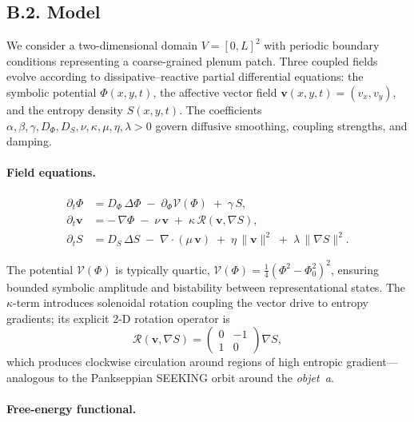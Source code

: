 \documentclass[12pt,a4paper]{article}
\begin{document}
\subsection*{B.2. Model}

We consider a two-dimensional domain \(V=[0,L]^2\) with periodic boundary conditions representing a coarse-grained plenum patch.
Three coupled fields evolve according to dissipative–reactive partial differential equations: the symbolic potential \(\Phi(x,y,t)\), the affective vector field \(\mathbf{v}(x,y,t)=(v_x,v_y)\), and the entropy density \(S(x,y,t)\).
The coefficients
\(\alpha,\beta,\gamma,D_\Phi,D_S,\nu,\kappa,\mu,\eta,\lambda>0\)
govern diffusive smoothing, coupling strengths, and damping.

\paragraph{Field equations.}

\begin{align}
\partial_t \Phi &= D_\Phi\,\Delta \Phi \;-\; \partial_\Phi \mathcal{V}(\Phi) \;+\; \gamma\,S, \label{eq:B-Phi}\\[0.3em]
\partial_t \mathbf{v} &= -\,\nabla \Phi \;-\; \nu\,\mathbf{v} \;+\; \kappa\,\mathcal{R}(\mathbf{v},\nabla S), \label{eq:B-v}\\[0.3em]
\partial_t S &= D_S\,\Delta S \;-\; \nabla\!\cdot(\mu\,\mathbf{v}) \;+\; \eta\,\|\mathbf{v}\|^2 \;+\; \lambda\,\|\nabla S\|^2. \label{eq:B-S}
\end{align}

The potential \(\mathcal{V}(\Phi)\) is typically quartic,
\(\mathcal{V}(\Phi)=\frac{1}{4}(\Phi^2-\Phi_0^2)^2\),
ensuring bounded symbolic amplitude and bistability between representational states.
The \(\kappa\)-term introduces solenoidal rotation coupling the vector drive to entropy gradients; its explicit 2-D rotation operator is
\[
\mathcal{R}(\mathbf{v},\nabla S)
 = \begin{pmatrix} 0 & -1 \\[2pt] 1 & 0 \end{pmatrix}\!\nabla S,
\]
which produces clockwise circulation around regions of high entropic gradient—analogous to the Pankseppian SEEKING orbit around the \emph{objet~a}.

\paragraph{Free-energy functional.}
\end{document}
